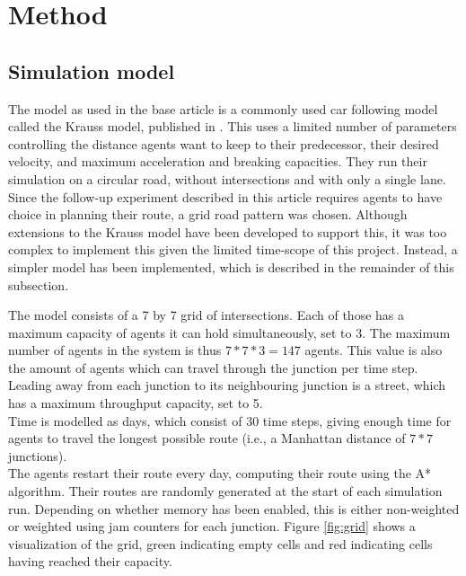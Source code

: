 \documentclass[a4paper,hidelinks]{article}
\begin{document}
\section{Method}
\subsection{Simulation model}
The model as used in the base article is a commonly used car following model called the Krauss model, published in \cite{krauss1998microscopic}. This uses a limited number of parameters controlling the distance agents want to keep to their predecessor, their desired velocity, and maximum acceleration and breaking capacities. They run their simulation on a circular road, without intersections and with only a single lane. \\
Since the follow-up experiment described in this article requires agents to have choice in planning their route, a grid road pattern was chosen. Although extensions to the Krauss model have been developed to support this, it was too complex to implement this given the limited time-scope of this project. Instead, a simpler model has been implemented, which is described in the remainder of this subsection.

The model consists of a 7 by 7 grid of intersections. Each of those has a maximum capacity of agents it can hold simultaneously, set to 3. The maximum number of agents in the system is thus $7*7*3=147$ agents. This value is also the amount of agents which can travel through the junction per time step. Leading away from each junction to its neighbouring junction is a street, which has a maximum throughput capacity, set to 5. \\
Time is modelled as days, which consist of 30 time steps, giving enough time for agents to travel the longest possible route (i.e., a Manhattan distance of $7*7$ junctions). \\
The agents restart their route every day, computing their route using the A* algorithm. Their routes are randomly generated at the start of each simulation run. Depending on whether memory has been enabled, this is either non-weighted or weighted using jam counters for each junction.
Figure \ref{fig:grid} shows a visualization of the grid, green indicating empty cells and red indicating cells having reached their capacity.
\end{document}
